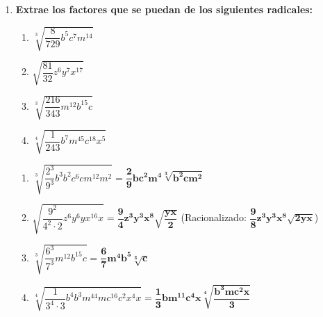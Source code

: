 \documentclass[a4paper,12pt]{article}
\begin{document}
\begin{enumerate}
    \item \textbf{Extrae los factores que se puedan de los siguientes radicales:}
        \begin{enumerate}[label=\alph*)]
            \item $\sqrt[3]{\dfrac{8}{729} b^{5} c^{7} m^{14}}$
            \item $\sqrt{\dfrac{81}{32} z^{6} y^{7} x^{17}}$
            \item $\sqrt[3]{\dfrac{216}{343} m^{12} b^{15} c}$
            \item $\sqrt[4]{\dfrac{1}{243} b^{7} m^{45} c^{18} x^{5}}$
        \end{enumerate}
        \begin{solucion}
            \begin{enumerate}[label=\alph*)]
                \item $\sqrt[3]{\dfrac{2^{3}}{9^{3}} b^{3} b^{2} c^{6} c m^{12} m^{2}} = \mathbf{\dfrac{2}{9} b c^{2} m^{4} \sqrt[3]{b^{2} c m^{2}}}$
                \item $\sqrt{\dfrac{9^{2}}{4^{2} \cdot 2} z^{6} y^{6} y x^{16} x} = \mathbf{\dfrac{9}{4} z^{3} y^{3} x^{8} \sqrt{\dfrac{yx}{2}}}$ \quad (Racionalizado: $\mathbf{\dfrac{9}{8} z^{3} y^{3} x^{8} \sqrt{2yx}}$)
                \item $\sqrt[3]{\dfrac{6^{3}}{7^{3}} m^{12} b^{15} c} = \mathbf{\dfrac{6}{7} m^{4} b^{5} \sqrt[3]{c}}$
                \item $\sqrt[4]{\dfrac{1}{3^{4} \cdot 3} b^{4} b^{3} m^{44} m c^{16} c^{2} x^{4} x} = \mathbf{\dfrac{1}{3} b m^{11} c^{4} x \sqrt[4]{\dfrac{b^{3} m c^{2} x}{3}}}$
            \end{enumerate}
        \end{solucion}


\end{enumerate}
\end{document}
